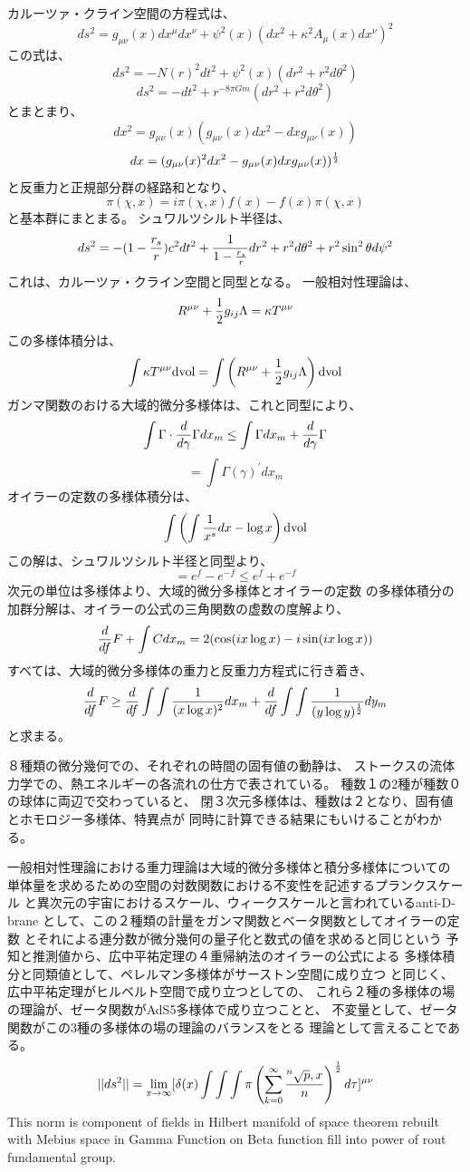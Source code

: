 \documentclass{jsarticle}
\begin{document}
 カルーツァ・クライン空間の方程式は、
    $$ ds^2 = g_{\mu\nu}(x)dx^{\mu}dx^{\nu} + \psi^2(x)(dx^2 + \kappa^2
    A_{\mu}(x)dx^{\nu})^2 $$
    この式は、
    $$ ds^2 = -N(r)^2dt^2 + \psi^2(x)(dr^2 + r^2d\theta^2) $$
    $$ ds^2 = -dt^2 + r^{-8\pi Gm}(dr^2 + r^2d\theta^2) $$
    とまとまり、
    $$ dx^2 = g_{\mu\nu}(x)(g_{\mu\nu}(x)dx^2 - dxg_{\mu\nu}(x)) $$
    $$ dx = (g_{\mu\nu}(x)^2dx^2 - g_{\mu\nu}(x)dx g_{\mu\nu}(x))^{1 \over 2} $$
    と反重力と正規部分群の経路和となり、　
    $$ \pi(\chi, x) = i \pi (\chi, x)f(x) - f(x)  \pi (\chi, x) $$
    と基本群にまとまる。
    シュワルツシルト半径は、
    $$ ds^2 = -(1 - {r_s \over r})c^2 dt^2 + {1 \over {{1 - {r_s \over r}}}} 
    dr^2 + r^2 d \theta^2 + r^2 \sin^2 \theta d \psi^2 $$
    これは、カルーツァ・クライン空間と同型となる。
    一般相対性理論は、
    $$ R^{\mu\nu} + {1 \over 2}g_{ij}\Lambda = \kappa T^{\mu\nu} $$
    この多様体積分は、
    $$ \int \kappa T^{\mu\nu}\mathrm{dvol} = \int  \left(R^{\mu\nu} + 
    {1 \over 2}g_{ij}\Lambda\right)\mathrm{dvol}  $$
    ガンマ関数のおける大域的微分多様体は、これと同型により、
    $$ \int \Gamma \cdot {d \over {d \gamma}}{\Gamma dx_m} \le \int \Gamma
    dx_m + {d \over d \gamma}\Gamma $$
    $$ = \int \Gamma(\gamma)^{'}dx_m $$
    オイラーの定数の多様体積分は、
    $$ \int \left({{\int {1 \over x^s}}dx - \log x} \right)\mathrm{dvol} $$
    この解は、シュワルツシルト半径と同型より、
    $$ = e^f - e^{-f} \le {e^f + e^{-f}} $$
    次元の単位は多様体より、大域的微分多様体とオイラーの定数
    の多様体積分の加群分解は、オイラーの公式の三角関数の虚数の度解より、
    $$ {d \over df}F + \int C dx_m = 2 (\cos (i x \log x) 
    - i \sin (i x \log x)) $$
    すべては、大域的微分多様体の重力と反重力方程式に行き着き、
    $$ {d \over df}F \ge {d \over df}\int \int{1 \over (x \log x)^2}dx_m
    + {d \over df}\int \int{1 \over (y \log y)^{1 \over 2}}dy_m $$
    と求まる。


  ８種類の微分幾何での、それぞれの時間の固有値の動静は、
  ストークスの流体力学での、熱エネルギーの各流れの仕方で表されている。
  種数１の2種が種数０の球体に両辺で交わっていると、
  閉３次元多様体は、種数は２となり、固有値とホモロジー多様体、特異点が
  同時に計算できる結果にもいけることがわかる。

一般相対性理論における重力理論は大域的微分多様体と積分多様体についての 単体量を求めるための空間の対数関数における不変性を記述するプランクスケール と異次元の宇宙におけるスケール、ウィークスケールと言われているanti-D-brane として、この２種類の計量をガンマ関数とベータ関数としてオイラーの定数 とそれによる連分数が微分幾何の量子化と数式の値を求めると同じという 予知と推測値から、広中平祐定理の４重帰納法のオイラーの公式による 多様体積分と同類値として、ペレルマン多様体がサーストン空間に成り立つ と同じく、広中平祐定理がヒルベルト空間で成り立つとしての、 これら２種の多様体の場の理論が、ゼータ関数がAdS5多様体で成り立つことと、 不変量として、ゼータ関数がこの3種の多様体の場の理論のバランスをとる
  理論として言えることである。
$$ ||ds^2|| = \lim_{x \to \infty} [\delta(x) \int \int \int \pi \left( \sum_{k=0}^{\infty}
		{{}^n\sqrt{p},x \over n} \right)
^{1 \over 2}d \tau]^{\mu\nu} $$
  This norm is component of fields in Hilbert manifold of space theorem rebuilt with
Mebius space in Gamma Function on Beta function fill into power of rout fundamental
group.
\end{document}
